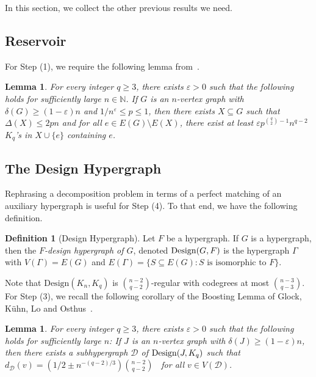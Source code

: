 \documentclass[11pt]{article}
\numberwithin{equation}{section}
\newcommand{\eps}{\varepsilon}
\newcounter{i}
\theoremstyle{plain}
\newtheorem{lem}[thm]{Lemma}
\theoremstyle{plain} %
\theoremstyle{definition}
\newtheorem{definition}[thm]{Definition}
\newcommand{\cD}{\mathcal{D}}
\begin{document}
In this section, we collect the other previous results we need.

\subsection{Reservoir}

For Step (1), we require the following lemma from~\cite{DPI}.

\begin{lem}\label{lem:reservoir}
  For every integer $q\geq 3$, there exists $\eps > 0$ such that the following holds for sufficiently large $n \in \mathbb N$.  If $G$ is an $n$-vertex graph with $\delta(G)\ge (1-\varepsilon)n$ and $1 / n^\eps \leq p \leq 1$, then there exists $X\subseteq G$ such that $\Delta(X)\le 2pn$ and for all $e\in E(G)\setminus E(X)$, there exist at least $\eps p^{\binom{q}{2}-1}n^{q-2}$ $K_q$'s in $X\cup \{e\}$ containing $e$.
\end{lem}

\subsection{The Design Hypergraph}

Rephrasing a decomposition problem in terms of a perfect matching of an auxiliary hypergraph is useful for Step (4). To that end, we have the following definition.

\begin{definition}[Design Hypergraph]
Let $F$ be a hypergraph. If $G$ is a hypergraph, then the \emph{$F$-design hypergraph of $G$}, denoted ${\rm Design}(G,F)$ %
is the hypergraph $\Gamma$ with $V(\Gamma)=E(G)$ and $E(\Gamma) = \{S\subseteq E(G): S \text{ is isomorphic to } F\}$.
\end{definition}

Note that $\mathrm{Design}(K_n, K_q)$ is $\binom{n - 2}{q - 2}$-regular with codegrees at most $\binom{n - 3}{q - 3}$.
For Step (3), we recall the following corollary of the Boosting Lemma of Glock, K\"uhn, Lo and Osthus~\cite{GKLO16}.

\begin{lem}\label{lem:RegBoost}
For every integer $q \geq 3$, there exists $\eps > 0$ such that the following holds for sufficiently large $n$:  If $J$ is an $n$-vertex graph with $\delta(J) \ge (1-\varepsilon)n$, then there exists a subhypergraph $\cD$ of ${\rm Design}(J,K_q)$ such that $d_\cD(v) = (1/2 \pm n^{-(q-2)/3})\left.\binom{n - 2}{q - 2}\middle.\right.$ for all $v\in V(\cD)$.
\end{lem}
\end{document}
